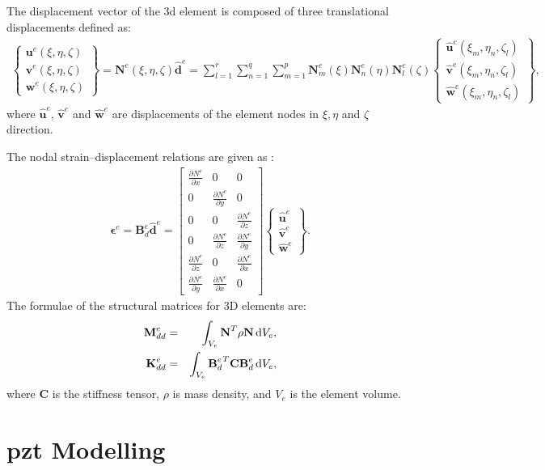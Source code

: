 \documentclass[11pt,a4paper,final]{report}
\begin{document}
The displacement vector of the \ac{3d} element is composed of three translational displacements defined as:
\begin{eqnarray}
	\left \{ \begin{array}{c}
		\textbf{u}^e(\xi,\eta,\zeta) \\
		\textbf{v}^e(\xi,\eta,\zeta) \\
		\textbf{w}^e(\xi,\eta,\zeta)
	\end{array} \right\}
	= \textbf{N}^e(\xi,\eta, \zeta)\widehat{\textbf{d}}^e
	= \sum_{l=1}^r\sum_{n=1}^q\sum_{m=1}^p\textbf{N}_m^e(\xi)\textbf{N}_n^e(\eta)\textbf{N}_l^e(\zeta)
	\left \{ \begin{array}{c}
		\widehat{\textbf{u}}^e(\xi_m,\eta_n,\zeta_l) \\
		\widehat{\textbf{v}}^e(\xi_m,\eta_n,\zeta_l) \\
		\widehat{\textbf{w}}^e(\xi_m,\eta_n,\zeta_l)
	\end{array} \right\},
	\label{eq:3D_displ}
\end{eqnarray}
where \(\widehat{\textbf{u}}^e\), \(\widehat{\textbf{v}}^e\) and 
\(\widehat{\textbf{w}}^e\) are displacements of the element nodes in \(\xi,\eta\) and \(\zeta\) direction.

The nodal strain--displacement relations are given as \cite{kudela20093d}:
\begin{eqnarray}
	\boldsymbol{\epsilon}^e=\textbf{B}_{d}^e\widehat{\textbf{d}}^e=
	\left [
	\begin{array}{ccc}
		\frac{\partial N^e}{\partial x} & 0 & 0\\
		0 & \frac{\partial N^e}{\partial y} & 0\\
		0 & 0 & \frac{\partial N^e}{\partial z}\\
		0 & \frac{\partial N^e}{\partial z} & \frac{\partial N^e}{\partial y}\\
		\frac{\partial N^e}{\partial z} & 0 & \frac{\partial N^e}{\partial x}\\
		\frac{\partial N^e}{\partial y} & \frac{\partial N^e}{\partial x} & 0
	\end{array} \right]
	\left \{ \begin{array}{c}
		\widehat{\textbf{u}}^e \\
		\widehat{\textbf{v}}^e \\
		\widehat{\textbf{w}}^e
	\end{array} \right\}.
\end{eqnarray}
The formulae of the structural matrices for 3D elements are:
\begin{eqnarray}
	\textbf{M}_{dd}^e & = & \int_{V_e}\textbf{N}^T\rho \textbf{N} \mathop{}\!\mathrm{d} V_e,\\
	\textbf{K}_{dd}^e & = & \int_{V_e}{\textbf{B}_d^e}^T\textbf{C}\textbf{B}_d^e \mathop{}\!\mathrm{d} V_e,
\end{eqnarray}
where \textbf{C} is the stiffness tensor, \(\rho\) is mass density, and \(V_e\) is the element volume. \section{\ac{pzt} Modelling}
\label{sec:PZTmodel}
\end{document}
